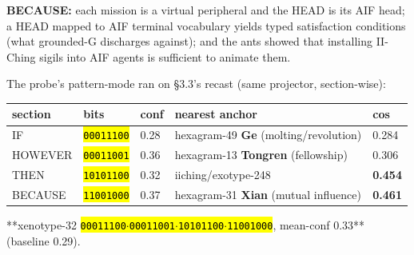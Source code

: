 \documentclass[11pt,oneside]{article}
\newcommand{\scopehl}[1]{\texttt{\hl{#1}}}
\begin{document}
\begin{phasebox}[title={3. DERIVE --- opened with a candidate runner (2026-06-10)}]
\begin{subbox}[title={3.3 The recast (Joe steer, 2026-06-10): HEAD as design pattern --- Golemization}]
\textbf{BECAUSE:} each mission is a virtual peripheral and the HEAD is its AIF
head; a HEAD mapped to AIF terminal vocabulary yields typed satisfaction
conditions (what grounded-G discharges against); and the ants showed that
installing II-Ching sigils into AIF agents is sufficient to animate them.

\end{subbox}
\begin{subbox}[title={3.3.1 v0.1 RESULT --- the Golemization run (2026-06-10)}]

The probe's pattern-mode ran on \S{}3.3's recast (same projector, section-wise):

\begin{center}\small\begin{tabular}{lllll}
\toprule
section & bits & conf & nearest anchor & cos \\
\midrule
IF & \scopehl{00011100} & 0.28 & hexagram-49 \textbf{Ge } (molting/revolution) & 0.284 \\
HOWEVER & \scopehl{00011001} & 0.36 & hexagram-13 \textbf{Tongren } (fellowship) & 0.306 \\
THEN & \scopehl{10101100} & 0.32 & iiching/exotype-248 & \textbf{0.454} \\
BECAUSE & \scopehl{11001000} & 0.37 & hexagram-31 \textbf{Xian } (mutual influence) & \textbf{0.461} \\
\bottomrule
\end{tabular}\end{center}

**xenotype-32 \scopehl{00011100$\cdot$00011001$\cdot$10101100$\cdot$11001000}, mean-conf 0.33** (baseline 0.29).


\end{subbox}
\end{phasebox}
\end{document}
